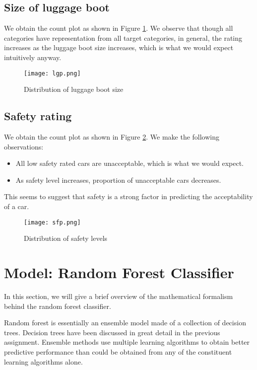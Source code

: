 \documentclass[conference]{IEEEtran}
\begin{document}
\subsection*{Size of luggage boot}

We obtain the count plot as shown in Figure \ref{lgp}. We observe that though all categories have representation from all target categories, in general, the rating increases as the luggage boot size increases, which is what we would expect intuitively anyway.

\begin{figure}[tbh]
\centering
\texttt{[image: lgp.png]}
\caption{Distribution of luggage boot size}
\label{lgp}
\end{figure}

\subsection*{Safety rating}

We obtain the count plot as shown in Figure \ref{sfp}. We make the following observations:

\begin{itemize}
    \item All low safety rated cars are unacceptable, which is what we would expect.
    \item As safety level increases, proportion of unacceptable cars decreases.
\end{itemize}

This seems to suggest that safety is a strong factor in predicting the acceptability of a car.

\begin{figure}[tbh]
\centering
\texttt{[image: sfp.png]}
\caption{Distribution of safety levels}
\label{sfp}
\end{figure}



\section{Model: Random Forest Classifier}

In this section, we will give a brief overview of the mathematical formalism behind the random forest classifier. 

Random forest is essentially an ensemble model made of a collection of decision trees. Decision trees have been discussed in great detail in the previous assignment. Ensemble methods use multiple learning algorithms to obtain better predictive performance than could be obtained from any of the constituent learning algorithms alone. 
\end{document}
